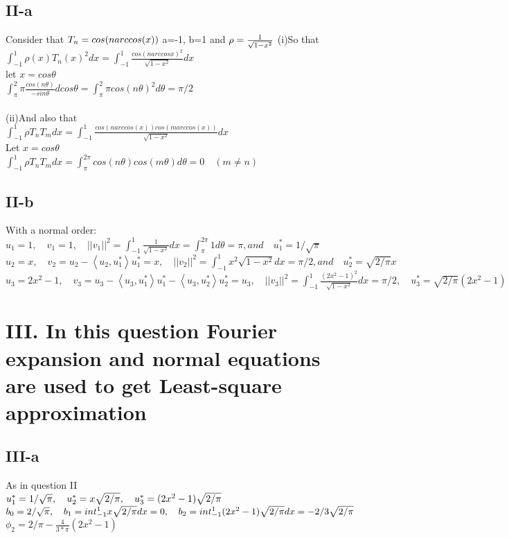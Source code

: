 \documentclass[twoside,a4paper]{article}
\begin{document}
\subsection*{II-a}
Consider that $T_n=cos(narccos(x))\\$
a=-1, b=1 and $\rho =  \frac{1}{\sqrt{1-x^2}}\\$
(i)So that $ \int_{-1}^1 \rho (x) T_n(x)^2 dx=\int_{-1}^1 \displaystyle\frac{cos(narccosx)^2}{\sqrt{1-x^2}} dx$\\
let $x=cos \theta$\\
 $ \int_{\pi}^2\pi \displaystyle\frac{cos(n \theta)}{-sin \theta} dcos\theta=\int_{\pi}^2\pi cos(n\theta)^2 d\theta =\pi/2 $\\
 \\
(ii)And also that \\
 $\int_{-1}^{1} \rho T_n T_m dx=\int_{-1}^{1} \displaystyle \frac{cos(n arccos(x)) cos(m arccos(x))}{\sqrt{1-x^2}} dx
 $\\
Let $x=cos \theta$\\
 $ \int_{-1}^{1} \rho T_n T_m dx=\int_{\pi}^{2\pi} cos(n\theta) cos(m \theta) d \theta =0 \quad (m \neq n)$\\

\subsection*{II-b}
With a normal order:
$u_1=1, \quad v_1= 1,  \quad ||v_1||^2  =\int_{-1}^{1} \frac{1}{\sqrt{1-x^2}} dx =\int_{\pi}^{2\pi} 1 d \theta =\pi, and \quad u^{*} _1 =1/\sqrt{\pi} $\\
$u_2=x, \quad v_2=u_2-\left< u_2,u^{*}_1 \right> u^{*}_1=x, \quad ||v_2||^2=\int_{-1}^{1} \displaystyle {x^2}{\sqrt{1-x^2} } dx =\pi/2, and \quad u^{*}_2=\sqrt{2/\pi} x$\\
$u_3=2x^2-1, \quad v_3=u_3-\left< u_3,u^{*}_1 \right> u^{*}_1-\left< u_3,u^{*}_2 \right> u^{*}_2=u_3, \quad ||v_3||^2=\int_{-1}^{1} \displaystyle \frac{(2x^2-1)^2}{\sqrt{1-x^2}} dx =\pi/2, \quad u^{*}_3 =\sqrt{2/\pi}(2x^2-1)$\\
\section*{III. In this question Fourier expansion and normal equations are used to get Least-square approximation}
\subsection*{III-a}
As in question II\\
$u^{*}_1=1/\sqrt{\pi}, \quad u^{*}_2=x\sqrt{2/\pi}, \quad u_3 ^{*}=(2x^2-1)\sqrt{2/\pi}\\$
$b_0=2/\sqrt{\pi}, \quad b_1=int_{-1}^{1} x\sqrt{2/\pi} dx=0, \quad b_2=int_{-1}^{1} (2x^2-1)\sqrt {2/\pi} dx =-2/3 \sqrt{2/\pi}\\$
$\phi_2=2/\pi -\frac{4}{3*\pi}(2x^2-1)$\\
\end{document}
